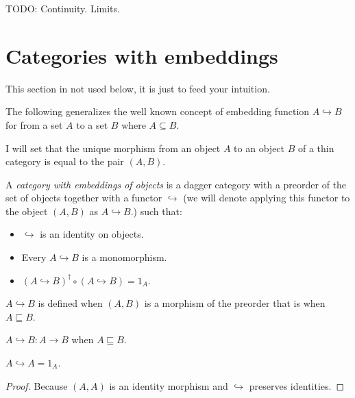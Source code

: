 TODO: Continuity. Limits.

\section{Categories with embeddings}

\begin{note}
This section in not used below, it is just to feed your intuition.
\end{note}

The following generalizes the well known concept of embedding function $A
\hookrightarrow B$ for from a set $A$ to a set $B$ where $A \subseteq B$.

I will set that the unique morphism from an object $A$ to an object $B$ of a
thin category is equal to the pair $(A , B)$.

\begin{defn}
  A \emph{category with embeddings of objects} is a dagger category with a
  preorder of the set of objects together with a functor $\hookrightarrow$ (we
  will denote applying this functor to the object $(A , B)$ as $A
  \hookrightarrow B$.) such that:
  \begin{itemize}
    \item $\hookrightarrow$ is an identity on objects.
    
    \item Every $A \hookrightarrow B$ is a monomorphism.
    
    \item $(A \hookrightarrow B)^{\dagger} \circ (A \hookrightarrow B) = 1_A$.
  \end{itemize}
\end{defn}

\begin{obvious}
$A\hookrightarrow B$ is defined when $(A , B)$ is a morphism of the preorder
that is when $A \sqsubseteq B$.
\end{obvious}

\begin{obvious}
$A \hookrightarrow B : A \rightarrow B$ when $A \sqsubseteq B$.
\end{obvious}

\begin{prop}
  $A \hookrightarrow A = 1_A$.
\end{prop}

\begin{proof}
  Because $(A , A)$ is an identity morphism and $\hookrightarrow$ preserves
  identities.
\end{proof}

